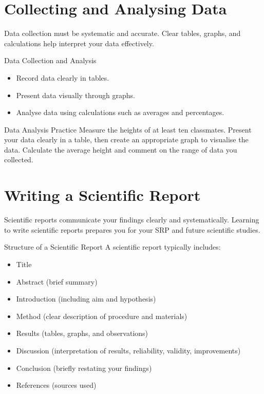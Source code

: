
\section{Collecting and Analysing Data}

Data collection must be systematic and accurate. Clear tables, graphs, and calculations help interpret your data effectively.

\begin{keyconcept}{Data Collection and Analysis}
\begin{itemize}
    \item Record data clearly in tables.
    \item Present data visually through graphs.
    \item Analyse data using calculations such as averages and percentages.
\end{itemize}
\end{keyconcept}


\begin{investigation}{Data Analysis Practice}
Measure the heights of at least ten classmates. Present your data clearly in a table, then create an appropriate graph to visualise the data. Calculate the average height and comment on the range of data you collected.
\end{investigation}

\section{Writing a Scientific Report}

Scientific reports communicate your findings clearly and systematically. Learning to write scientific reports prepares you for your SRP and future scientific studies.

\begin{keyconcept}{Structure of a Scientific Report}
A scientific report typically includes:
\begin{itemize}
    \item Title
    \item Abstract (brief summary)
    \item Introduction (including aim and hypothesis)
    \item Method (clear description of procedure and materials)
    \item Results (tables, graphs, and observations)
    \item Discussion (interpretation of results, reliability, validity, improvements)
    \item Conclusion (briefly restating your findings)
    \item References (sources used)
\end{itemize}
\end{keyconcept}

